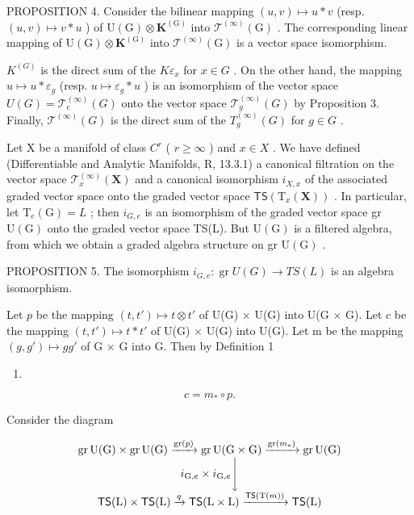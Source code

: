 PROPOSITION 4. Consider the bilinear mapping \((u,v)\mapsto u*v\) (resp. \((u,v)\mapsto v*u\) ) of \(\mathrm{U}(\mathrm{G})\otimes \mathbf{K}^{(\mathrm{G})}\) into \(\mathcal{T}^{(\infty)}(\mathrm{G})\) . The corresponding linear mapping of \(\mathrm{U}(\mathrm{G})\otimes \mathbf{K}^{(\mathrm{G})}\) into \(\mathcal{T}^{(\infty)}(\mathrm{G})\) is a vector space isomorphism.

\(K^{(G)}\) is the direct sum of the \(K\varepsilon_{x}\) for \(x\in G\) . On the other hand, the mapping \(u\mapsto u*\varepsilon_{g}\) (resp. \(u\mapsto\varepsilon_{g}*u\) ) is an isomorphism of the vector space \(U(G)=\mathcal{T}_{e}^{(\infty)}(G)\) onto the vector space \(\mathcal{T}_{g}^{(\infty)}(G)\) by Proposition 3. Finally, \(\mathcal{T}^{(\infty)}(G)\) is the direct sum of the \(T_{g}^{(\infty)}(G)\) for \(g\in G\) .

Let X be a manifold of class \(C^{r}\) ( \(r \geqslant \infty\) ) and \(x \in X\) . We have defined (Differentiable and Analytic Manifolds, R, 13.3.1) a canonical filtration on the vector space \(\mathcal{T}_{x}^{(\infty)}(\mathbf{X})\) and a canonical isomorphism \(i_{X,x}\) of the associated graded vector space onto the graded vector space \(\mathsf{TS}(\mathrm{T}_{x}(\mathbf{X}))\) . In particular, let \(\mathrm{T}_{e}(\mathrm{G}) = L\) ; then \(i_{G,e}\) is an isomorphism of the graded vector space gr \(\mathrm{U}(\mathrm{G})\) onto the graded vector space TS(L). But \(\mathrm{U}(\mathrm{G})\) is a filtered algebra, from which we obtain a graded algebra structure on gr \(\mathrm{U}(\mathrm{G})\) .

PROPOSITION 5. The isomorphism \(i_{G,e} \colon \operatorname{gr} U(G) \to TS(L)\) is an algebra isomorphism.

Let \(p\) be the mapping \((t, t') \mapsto t \otimes t'\) of U(G) × U(G) into U(G × G). Let \(c\) be the mapping \((t, t') \mapsto t * t'\) of U(G) × U(G) into U(G). Let m be the mapping \((g, g') \mapsto gg'\) of G × G into G. Then by Definition 1

\begin{enumerate}
\def\labelenumi{(\arabic{enumi})}
\tightlist
\item
\end{enumerate}

\[
c = m _ {*} \circ p.
\]

Consider the diagram

\[
\begin{array}{c} \operatorname{gr} \mathrm{U(G)} \times \operatorname{gr} \mathrm{U(G)} \xrightarrow {\operatorname{gr} (p)} \operatorname{gr} \mathrm{U(G \times G)} \xrightarrow {\operatorname{gr} (m _ {*})} \operatorname{gr} \mathrm{U(G)} \\ i _ {\mathrm{G}, e} \times i _ {\mathrm{G}, e} \Biggl \downarrow \\ \mathsf {T S} (\mathrm{L}) \times \mathsf {T S} (\mathrm{L}) \xrightarrow {q} \mathsf {T S} (\mathrm{L} \times \mathrm{L}) \xrightarrow {\mathsf {T S} (\mathrm{T} (m))} \mathsf {T S} (\mathrm{L}) \end{array}
\]

